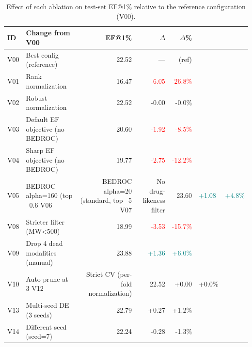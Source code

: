 \begin{table}[htbp]
\centering
\caption{Effect of each ablation on test-set EF@1\% relative to the reference configuration (V00).}
\label{tab:delta}
\small
\begin{tabular}{ll rrr}
\toprule
ID & Change from V00 & EF@1\% & $\Delta$ & $\Delta$\% \\
\midrule
  V00 & Best config (reference) & 22.52 & — & (ref) \\
\addlinespace
  V01 & Rank normalization & 16.47 & \textcolor{red}{-6.05} & \textcolor{red}{-26.8\%} \\
  V02 & Robust normalization & 22.52 & -0.00 & -0.0\% \\
\addlinespace
  V03 & Default EF objective (no BEDROC) & 20.60 & \textcolor{red}{-1.92} & \textcolor{red}{-8.5\%} \\
  V04 & Sharp EF objective (no BEDROC) & 19.77 & \textcolor{red}{-2.75} & \textcolor{red}{-12.2\%} \\
  V05 & BEDROC alpha=160 (top ~0.6%
  V06 & BEDROC alpha=20 (standard, top ~5%
\addlinespace
  V07 & No drug-likeness filter & 23.60 & \textcolor{teal}{+1.08} & \textcolor{teal}{+4.8\%} \\
  V08 & Stricter filter (MW<500) & 18.99 & \textcolor{red}{-3.53} & \textcolor{red}{-15.7\%} \\
\addlinespace
  V09 & Drop 4 dead modalities (manual) & 23.88 & \textcolor{teal}{+1.36} & \textcolor{teal}{+6.0\%} \\
  V10 & Auto-prune at 3%
\addlinespace
  V12 & Strict CV (per-fold normalization) & 22.52 & +0.00 & +0.0\% \\
  V13 & Multi-seed DE (3 seeds) & 22.79 & +0.27 & +1.2\% \\
  V14 & Different seed (seed=7) & 22.24 & -0.28 & -1.3\% \\
\bottomrule
\end{tabular}
\end{table}